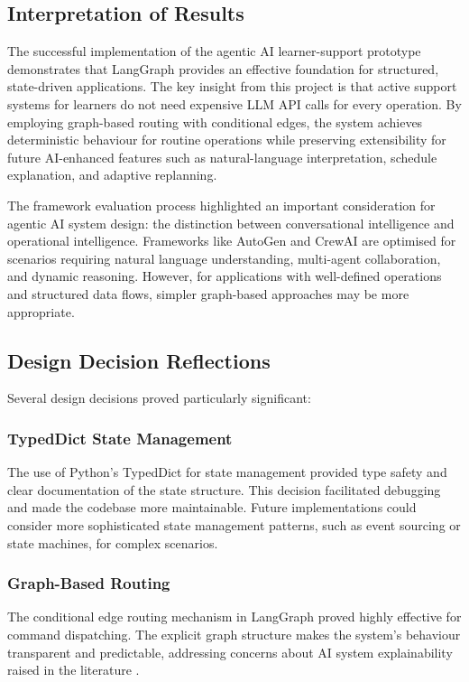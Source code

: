 \documentclass[12pt]{article}
\begin{document}
\subsection{Interpretation of Results}

The successful implementation of the agentic AI learner-support prototype demonstrates that LangGraph provides an effective foundation for structured, state-driven applications. The key insight from this project is that active support systems for learners do not need expensive LLM API calls for every operation. By employing graph-based routing with conditional edges, the system achieves deterministic behaviour for routine operations while preserving extensibility for future AI-enhanced features such as natural-language interpretation, schedule explanation, and adaptive replanning.

The framework evaluation process highlighted an important consideration for agentic AI system design: the distinction between conversational intelligence and operational intelligence. Frameworks like AutoGen and CrewAI are optimised for scenarios requiring natural language understanding, multi-agent collaboration, and dynamic reasoning. However, for applications with well-defined operations and structured data flows, simpler graph-based approaches may be more appropriate.

\subsection{Design Decision Reflections}

Several design decisions proved particularly significant:

\subsubsection{TypedDict State Management}
The use of Python's TypedDict for state management provided type safety and clear documentation of the state structure. This decision facilitated debugging and made the codebase more maintainable. Future implementations could consider more sophisticated state management patterns, such as event sourcing or state machines, for complex scenarios.

\subsubsection{Graph-Based Routing}
The conditional edge routing mechanism in LangGraph proved highly effective for command dispatching. The explicit graph structure makes the system's behaviour transparent and predictable, addressing concerns about AI system explainability raised in the literature \parencite{shavit2023practices}.
\end{document}
